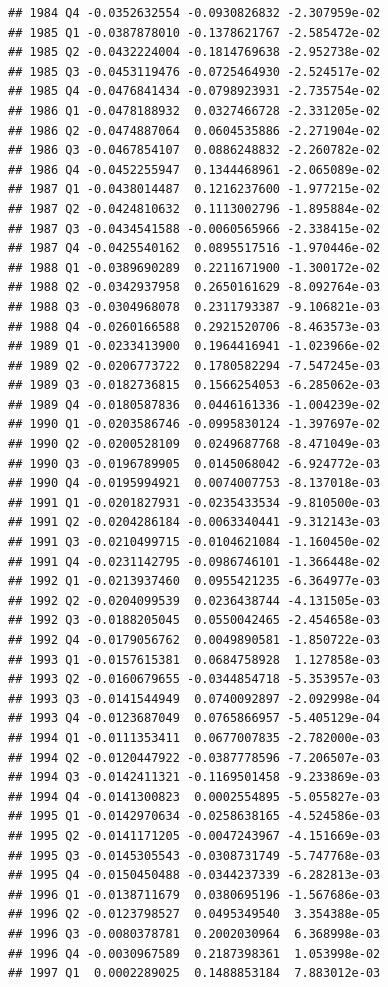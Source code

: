 \documentclass[12pt,a4paper,]{article}
\newcommand{\0}{\mathbf{0}}
\begin{document}
\begin{verbatim}
## 1984 Q4 -0.0352632554 -0.0930826832 -2.307959e-02
## 1985 Q1 -0.0387878010 -0.1378621767 -2.585472e-02
## 1985 Q2 -0.0432224004 -0.1814769638 -2.952738e-02
## 1985 Q3 -0.0453119476 -0.0725464930 -2.524517e-02
## 1985 Q4 -0.0476841434 -0.0798923931 -2.735754e-02
## 1986 Q1 -0.0478188932  0.0327466728 -2.331205e-02
## 1986 Q2 -0.0474887064  0.0604535886 -2.271904e-02
## 1986 Q3 -0.0467854107  0.0886248832 -2.260782e-02
## 1986 Q4 -0.0452255947  0.1344468961 -2.065089e-02
## 1987 Q1 -0.0438014487  0.1216237600 -1.977215e-02
## 1987 Q2 -0.0424810632  0.1113002796 -1.895884e-02
## 1987 Q3 -0.0434541588 -0.0060565966 -2.338415e-02
## 1987 Q4 -0.0425540162  0.0895517516 -1.970446e-02
## 1988 Q1 -0.0389690289  0.2211671900 -1.300172e-02
## 1988 Q2 -0.0342937958  0.2650161629 -8.092764e-03
## 1988 Q3 -0.0304968078  0.2311793387 -9.106821e-03
## 1988 Q4 -0.0260166588  0.2921520706 -8.463573e-03
## 1989 Q1 -0.0233413900  0.1964416941 -1.023966e-02
## 1989 Q2 -0.0206773722  0.1780582294 -7.547245e-03
## 1989 Q3 -0.0182736815  0.1566254053 -6.285062e-03
## 1989 Q4 -0.0180587836  0.0446161336 -1.004239e-02
## 1990 Q1 -0.0203586746 -0.0995830124 -1.397697e-02
## 1990 Q2 -0.0200528109  0.0249687768 -8.471049e-03
## 1990 Q3 -0.0196789905  0.0145068042 -6.924772e-03
## 1990 Q4 -0.0195994921  0.0074007753 -8.137018e-03
## 1991 Q1 -0.0201827931 -0.0235433534 -9.810500e-03
## 1991 Q2 -0.0204286184 -0.0063340441 -9.312143e-03
## 1991 Q3 -0.0210499715 -0.0104621084 -1.160450e-02
## 1991 Q4 -0.0231142795 -0.0986746101 -1.366448e-02
## 1992 Q1 -0.0213937460  0.0955421235 -6.364977e-03
## 1992 Q2 -0.0204099539  0.0236438744 -4.131505e-03
## 1992 Q3 -0.0188205045  0.0550042465 -2.454658e-03
## 1992 Q4 -0.0179056762  0.0049890581 -1.850722e-03
## 1993 Q1 -0.0157615381  0.0684758928  1.127858e-03
## 1993 Q2 -0.0160679655 -0.0344854718 -5.353957e-03
## 1993 Q3 -0.0141544949  0.0740092897 -2.092998e-04
## 1993 Q4 -0.0123687049  0.0765866957 -5.405129e-04
## 1994 Q1 -0.0111353411  0.0677007835 -2.782000e-03
## 1994 Q2 -0.0120447922 -0.0387778596 -7.206507e-03
## 1994 Q3 -0.0142411321 -0.1169501458 -9.233869e-03
## 1994 Q4 -0.0141300823  0.0002554895 -5.055827e-03
## 1995 Q1 -0.0142970634 -0.0258638165 -4.524586e-03
## 1995 Q2 -0.0141171205 -0.0047243967 -4.151669e-03
## 1995 Q3 -0.0145305543 -0.0308731749 -5.747768e-03
## 1995 Q4 -0.0150450488 -0.0344237339 -6.282813e-03
## 1996 Q1 -0.0138711679  0.0380695196 -1.567686e-03
## 1996 Q2 -0.0123798527  0.0495349540  3.354388e-05
## 1996 Q3 -0.0080378781  0.2002030964  6.368998e-03
## 1996 Q4 -0.0030967589  0.2187398361  1.053998e-02
## 1997 Q1  0.0002289025  0.1488853184  7.883012e-03

\end{verbatim}
\end{document}
